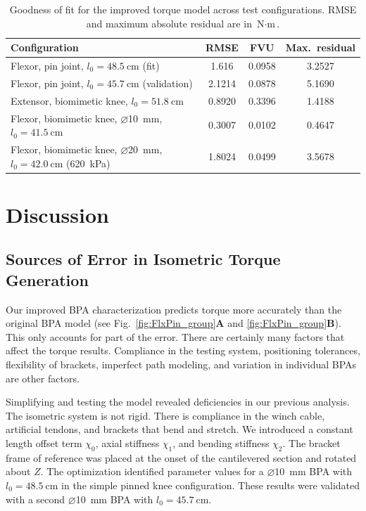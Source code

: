 \begin{table}[htbp]
\caption{Goodness of fit for the improved torque model across test configurations. RMSE and maximum absolute residual are in $\text{N}\cdot\text{m}$.}
\label{tab:TorqueFit}
\begin{tabular}{@{}lccc@{}}
\toprule
\textbf{Configuration} & \textbf{RMSE} & \textbf{FVU} & \textbf{Max.\ residual} \\
\midrule
Flexor, pin joint, $l_{0}=\qty{48.5}{\cm}$ (fit) & 1.616 & 0.0958 & 3.2527 \\
Flexor, pin joint, $l_{0}=\qty{45.7}{\cm}$ (validation) & 2.1214 & 0.0878 & 5.1690 \\
Extensor, biomimetic knee, $l_{0}=\qty{51.8}{\cm}$ & 0.8920 & 0.3396 & 1.4188 \\
Flexor, biomimetic knee, $\diameter$\qty{10}{\mm}, $l_{0}=\qty{41.5}{\cm}$ & 0.3007 & 0.0102 & 0.4647 \\
Flexor, biomimetic knee, $\diameter$\qty{20}{\mm}, $l_{0}=\qty{42.0}{\cm}$ (\qty{620}{\kPa}) & 1.8024 & 0.0499 & 3.5678 \\
\bottomrule
\end{tabular}
\end{table}

\section{Discussion}

\subsection{Sources of Error in Isometric Torque Generation}\label{sec:disc_error}

Our improved BPA characterization predicts torque more accurately than the original BPA model (see Fig.~\ref{fig:FlxPin_group}\textbf{A} and \ref{fig:FlxPin_group}\textbf{B}). This only accounts for part of the error. There are certainly many factors that affect the torque results. Compliance in the testing system, positioning tolerances, flexibility of brackets, imperfect path modeling, and variation in individual BPAs are other factors.

Simplifying and testing the model revealed deficiencies in our previous analysis. The isometric system is not rigid. There is compliance in the winch cable, artificial tendons, and brackets that bend and stretch. We introduced a constant length offset term $\chi_{0}$, axial stiffness $\chi_{1}$, and bending stiffness $\chi_{2}$. The bracket frame of reference was placed at the onset of the cantilevered section and rotated about $Z$.  The optimization identified parameter values for a $\diameter$\qty{10}{\mm} BPA with $l_{0}=\qty{48.5}{\cm}$ in the simple pinned knee configuration. These results were validated with a second $\diameter$\qty{10}{\mm} BPA with $l_{0}=\qty{45.7}{\cm}$.

